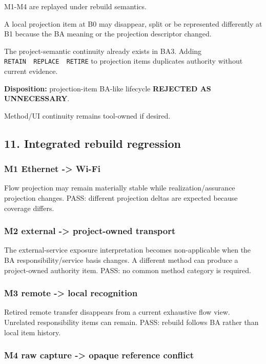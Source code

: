 \documentclass[
  11pt,
  a4paper,
]{article}
\begin{document}
M1-M4 are replayed under rebuild semantics.

A local projection item at B0 may disappear, split or be represented
differently at B1 because the BA meaning or the projection descriptor
changed.

The project-semantic continuity already exists in BA3. Adding
\texttt{RETAIN\ \textbar{}\ REPLACE\ \textbar{}\ RETIRE} to projection
items duplicates authority without current evidence.

\textbf{Disposition:} projection-item BA-like lifecycle \textbf{REJECTED
AS UNNECESSARY}.

Method/UI continuity remains tool-owned if desired.

\subsection{11. Integrated rebuild
regression}\label{integrated-rebuild-regression}

\subsubsection{M1 Ethernet -\textgreater{}
Wi-Fi}\label{m1-ethernet---wi-fi}

Flow projection may remain materially stable while realization/assurance
projection changes. PASS: different projection deltas are expected
because coverage differs.

\subsubsection{M2 external -\textgreater{} project-owned
transport}\label{m2-external---project-owned-transport}

The external-service exposure interpretation becomes non-applicable when
the BA responsibility/service basis changes. A different method can
produce a project-owned authority item. PASS: no common method category
is required.

\subsubsection{M3 remote -\textgreater{} local
recognition}\label{m3-remote---local-recognition}

Retired remote transfer disappears from a current exhaustive flow view.
Unrelated responsibility items can remain. PASS: rebuild follows BA
rather than local item history.

\subsubsection{M4 raw capture -\textgreater{} opaque reference
conflict}\label{m4-raw-capture---opaque-reference-conflict}
\end{document}
